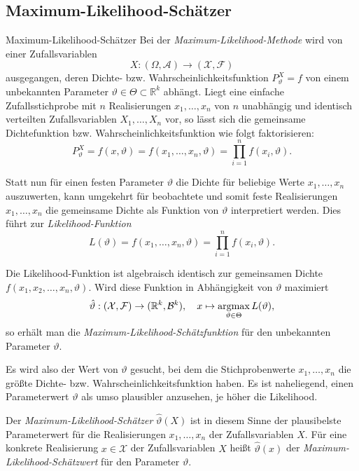 \subsection{Maximum-Likelihood-Schätzer}

\begin{defi}{Maximum-Likelihood-Schätzer}
    Bei der \emph{Maximum-Likelihood-Methode} wird von einer Zufallsvariablen
    \[
        X: (\Omega, \mathcal{A}) \to (\mathcal{X}, \mathcal{F})
    \]
    ausgegangen, deren Dichte- bzw. Wahrscheinlichkeitsfunktion $P_\vartheta^X = f$ von einem unbekannten Parameter $\vartheta \in \Theta \subset \mathbb{R}^k$ abhängt.
    Liegt eine einfache Zufallsstichprobe mit $n$ Realisierungen $x_1, \dotsc, x_n$ von $n$ unabhängig und identisch verteilten Zufallsvariablen $X_1, \dotsc, X_n$ vor, so lässt sich die gemeinsame Dichtefunktion bzw. Wahrscheinlichkeitsfunktion wie folgt faktorisieren:
    \[
        P_\vartheta^X = f(x, \vartheta) = f(x_1, \dotsc, x_n, \vartheta) = \prod_{i=1}^n f(x_i, \vartheta).
    \]

    Statt nun für einen festen Parameter $\vartheta$ die Dichte für beliebige Werte $x_1, \dotsc, x_n$ auszuwerten, kann umgekehrt für beobachtete und somit feste Realisierungen $x_1, \dotsc, x_n$ die gemeinsame Dichte als Funktion von $\vartheta$ interpretiert werden.
    Dies führt zur \emph{Likelihood-Funktion}
    \[
        L(\vartheta) = f(x_1, \dotsc, x_n, \vartheta) = \prod_{i=1}^n f(x_i, \vartheta).
    \]

    Die Likelihood-Funktion ist algebraisch identisch zur gemeinsamen Dichte $f(x_1, x_2, \dotsc, x_n, \vartheta)$.
    Wird diese Funktion in Abhängigkeit von $\vartheta$ maximiert
    \[
        \hat{\vartheta}: (\mathcal{X}, \mathcal{F}) \to (\mathbb{R}^k, \mathcal{B}^k), \quad x \mapsto \operatorname*{argmax}_{\vartheta \in \Theta} L(\vartheta),
    \]
    so erhält man die \emph{Maximum-Likelihood-Schätzfunktion} für den unbekannten Parameter $\vartheta$.

    Es wird also der Wert von $\vartheta$ gesucht, bei dem die Stichprobenwerte $x_1, \dotsc, x_n$ die größte Dichte- bzw. Wahrscheinlichkeitsfunktion haben.
    Es ist naheliegend, einen Parameterwert $\vartheta$ als umso plausibler anzusehen, je höher die Likelihood.

    Der \emph{Maximum-Likelihood-Schätzer} $\hat{\vartheta}(X)$ ist in diesem Sinne der plausibelste Parameterwert für die Realisierungen $x_1, \dotsc, x_n$ der Zufallsvariablen $X$.
    Für eine konkrete Realisierung $x \in \mathcal{X}$ der Zufallsvariablen $X$ heißt $\hat{\vartheta}(x)$ der \emph{Maximum-Likelihood-Schätzwert} für den Parameter $\vartheta$.


\end{defi}
